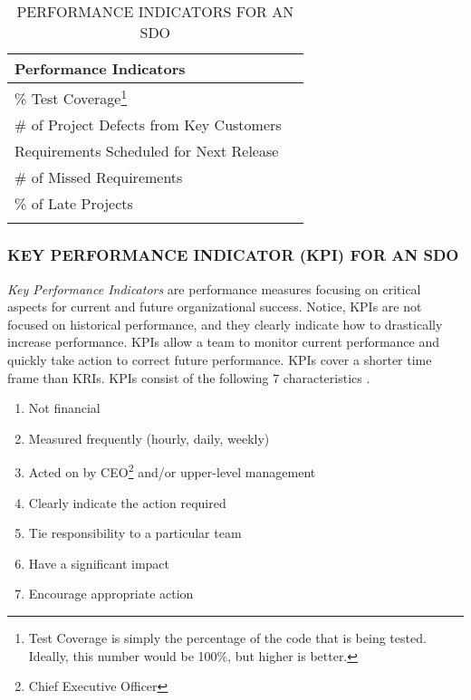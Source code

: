 \documentclass[SDSUThesis.tex]{subfiles}
\begin{document}
            \begin{longtable}{@{}l l}
                \toprule%
                 \centering%
                 {\bfseries Performance Indicators} &
                 \\
                
                \cmidrule[0.4pt](r{0.125em}){1-1}%
                \endhead
                
                \% Test Coverage\footnote{Test Coverage is simply the percentage 
                    of the code that is being tested. Ideally, this 
                    number would be 100\%, but higher is better.}   \\
                \myrowcolour%
                \# of Project Defects from Key Customers  \\
                Requirements Scheduled for Next Release  \\
                \myrowcolour%
                \# of Missed Requirements \\
                \% of Late Projects \\
                
                \bottomrule
                
                \caption{PERFORMANCE INDICATORS FOR AN SDO}
                \label{tab:PI}
            \end{longtable}
            
        \subsubsection{KEY PERFORMANCE INDICATOR (KPI) FOR AN SDO}
            \textit{Key Performance Indicators} are performance measures
            focusing on critical aspects for current and future organizational
            success.  Notice, KPIs are not focused on historical performance,
            and they clearly indicate how to drastically increase performance.
            KPIs allow a team to monitor current performance and 
            quickly take action to correct future performance.
            KPIs cover a shorter time frame than KRIs.
            KPIs consist of the following 7 characteristics \cite{parmenter2010}.
            \begin{enumerate}
                \item Not financial
                \item Measured frequently (hourly, daily, weekly)
                \item Acted on by CEO\footnote{Chief Executive Officer} 
                    and/or upper-level management 
                \item Clearly indicate the action required
                \item Tie responsibility to a particular team
                \item Have a significant impact
                \item Encourage appropriate action
            \end{enumerate}
            
\end{document}
